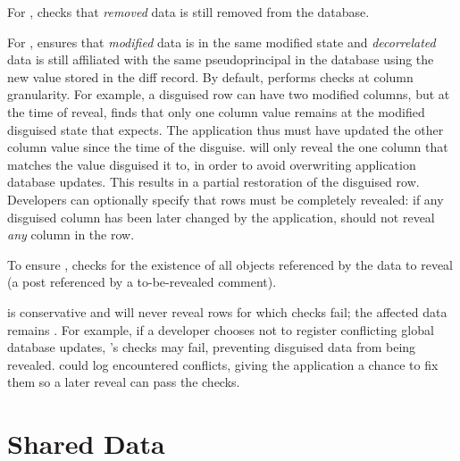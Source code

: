 For \one{}, \sys checks that \emph{removed} \xxed data is still removed from the
database.
%

%
For \two{}, \sys ensures that \emph{modified} \xxed data is in the same modified
state and \emph{decorrelated} \xxed data is still affiliated with the same
pseudoprincipal in the database using the new value stored in the diff record.
%
By default, \sys performs checks at column granularity. For example, a disguised
row can have two modified columns, but at the time of reveal, \sys finds that
only one column value remains at the modified disguised state that \sys expects.
The application thus must have updated the other column value since the time of
the disguise. \sys will only reveal the one column that matches the value \sys
disguised it to, in order to avoid overwriting application database updates.
This results in a partial restoration of the disguised row. Developers can
optionally specify that rows must be completely revealed: if any disguised column
has been later changed by the application, \sys should not reveal \emph{any} column in
the row.
%

%
To ensure \three{}, \sys checks for the existence of all objects referenced by
the data to reveal (\eg a post referenced by a to-be-revealed comment).

\sys is conservative and will never reveal rows for which checks fail; the
affected data remains \xxed.  For example, if a developer chooses not to
register conflicting global database updates, \sys's checks may
fail, preventing disguised data from being revealed.
%
\sys could log encountered conflicts, giving the application a chance to fix
them so a later reveal can pass the checks.


\section{Shared Data}
\label{s:design:shared}

